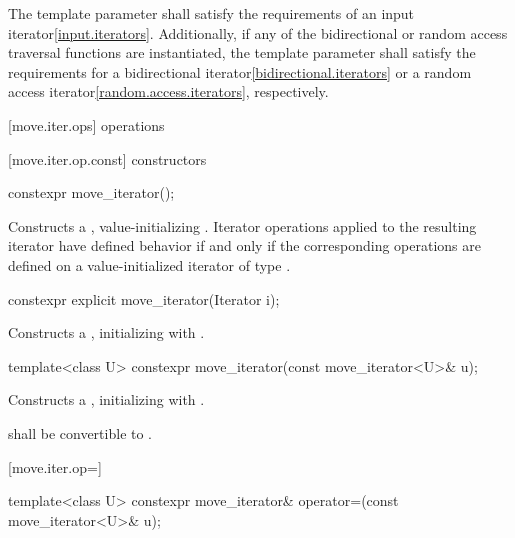 \pnum
The template parameter  shall satisfy
the requirements of an input iterator\ref{input.iterators}.
Additionally, if any of the bidirectional or random access traversal
functions are instantiated, the template parameter shall satisfy the
requirements for a bidirectional iterator\ref{bidirectional.iterators}
or a random access iterator\ref{random.access.iterators}, respectively.

[move.iter.ops]{ operations}

[move.iter.op.const]{ constructors}

%
\begin{itemdecl}
constexpr move_iterator();
\end{itemdecl}

\begin{itemdescr}
\pnum
\effects Constructs a , value-initializing
. Iterator operations applied to the resulting
iterator have defined behavior if and only if the corresponding operations are defined
on a value-initialized iterator of type .
\end{itemdescr}


%
\begin{itemdecl}
constexpr explicit move_iterator(Iterator i);
\end{itemdecl}

\begin{itemdescr}
\pnum
\effects Constructs a , initializing
 with .
\end{itemdescr}


%
\begin{itemdecl}
template<class U> constexpr move_iterator(const move_iterator<U>& u);
\end{itemdecl}

\begin{itemdescr}
\pnum
\effects Constructs a , initializing
 with .

\pnum
\requires {} shall be convertible to
.
\end{itemdescr}

[move.iter.op=]{}

%
\begin{itemdecl}
template<class U> constexpr move_iterator& operator=(const move_iterator<U>& u);
\end{itemdecl}

